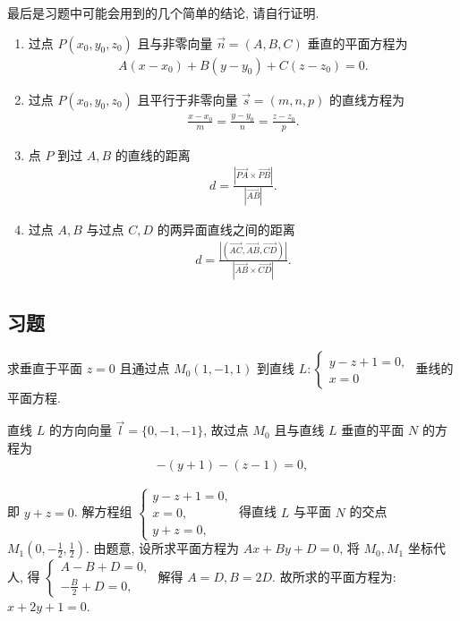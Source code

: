 最后是习题中可能会用到的几个简单的结论, 请自行证明.
\begin{enumerate}
	\item 过点 $P\left(x_0, y_0, z_0\right)$ 且与非零向量 $\vec{n}=(A, B, C)$ 垂直的平面方程为
	      \begin{align*}
		      A\left(x-x_0\right)+B\left(y-y_0\right)+C\left(z-z_0\right)=0 .
	      \end{align*}
	\item 过点 $P\left(x_0, y_0, z_0\right)$ 且平行于非零向量 $\vec{s}=(m, n, p)$ 的直线方程为
	      \begin{align*}
		      \frac{x-x_0}{m}=\frac{y-y_0}{n}=\frac{z-z_0}{p} .
	      \end{align*}
	\item  点 $P$ 到过 $A ,  B$ 的直线的距离
	      \begin{align*}
		      d=\frac{|\overrightarrow{P A} \times \overrightarrow{P B}|}{|\overrightarrow{A B}|} .
	      \end{align*}
	\item 过点 $A ,  B$ 与过点 $C ,  D$ 的两异面直线之间的距离
	      \begin{align*}
		      d=\frac{|(\overrightarrow{A C}, \overrightarrow{A B}, \overrightarrow{C D})|}{|\overrightarrow{A B} \times \overrightarrow{C D}|}.
	      \end{align*}
\end{enumerate}

\subsection{习题}
\begin{exercise}
	求垂直于平面 $z=0$ 且通过点 $M_0(1,-1,1)$ 到直线 $L:\left\{\begin{array}{l}y-z+1=0, \\ x=0\end{array}\right.$ 垂线的平面方程.
\end{exercise}
\begin{solution}
	直线 $L$ 的方向向量 $\vec{l}=\{0,-1,-1\}$, 故过点 $M_0$ 且与直线 $L$ 垂直的平面 $N$ 的方程为
	\begin{align*}
		-(y+1)-(z-1)=0,
	\end{align*}

	即 $y+z=0$.
	解方程组 $\left\{\begin{array}{l}y-z+1=0, \\ x=0, \\ y+z=0,\end{array}\right.$ 得直线 $L$ 与平面 $N$ 的交点 $M_1\left(0,-\frac{1}{2}, \frac{1}{2}\right)$.
	由题意, 设所求平面方程为 $A x+B y+D=0$, 将 $M_0 ,  M_1$ 坐标代人, 得 $\left\{\begin{array}{l}A-B+D=0, \\ -\frac{B}{2}+D=0,\end{array}\right.$ 解得 $A=D, B=2 D$.
	故所求的平面方程为: $x+2 y+1=0$.
\end{solution}

